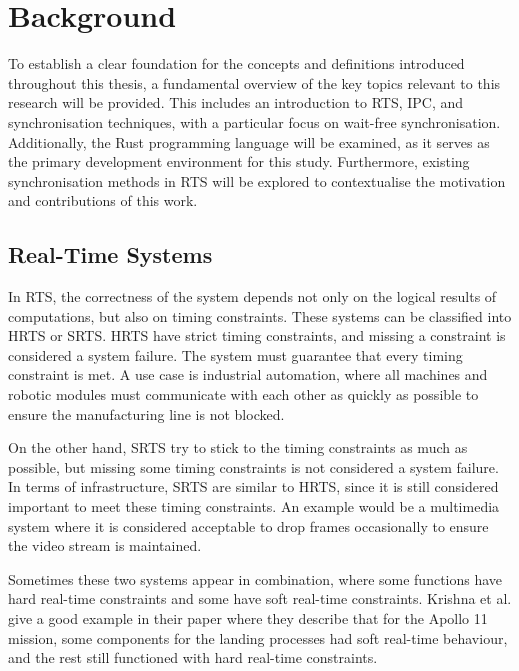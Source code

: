 \chapter{Background}\label{ch:background}

To establish a clear foundation for the concepts and definitions introduced throughout this thesis, a fundamental overview of the key topics relevant to this research will be provided. This includes an introduction to \ac{RTS}, \acf{IPC}, and synchronisation techniques, with a particular focus on wait-free synchronisation. Additionally, the Rust programming language will be examined, as it serves as the primary development environment for this study. Furthermore, existing synchronisation methods in \ac{RTS} will be explored to contextualise the motivation and contributions of this work.

\section{Real-Time Systems}\label{sec:real-time}

In \ac{RTS}, the correctness of the system depends not only on the logical results of computations, but also on timing constraints. These systems can be classified into \ac{HRTS} or \ac{SRTS}. \ac{HRTS} have strict timing constraints, and missing a constraint is considered a system failure. The system must guarantee that every timing constraint is met. A use case is industrial automation, where all machines and robotic modules must communicate with each other as quickly as possible to ensure the manufacturing line is not blocked. \cite{HardSoftRealTime}

On the other hand, \ac{SRTS} try to stick to the timing constraints as much as possible, but missing some timing constraints is not considered a system failure. In terms of infrastructure, \ac{SRTS} are similar to \ac{HRTS}, since it is still considered important to meet these timing constraints. An example would be a multimedia system where it is considered acceptable to drop frames occasionally to ensure the video stream is maintained. \cite{HardSoftRealTime}

Sometimes these two systems appear in combination, where some functions have hard real-time constraints and some have soft real-time constraints. Krishna et al. give a good example in their paper where they describe that for the Apollo 11 mission, some components for the landing processes had soft real-time behaviour, and the rest still functioned with hard real-time constraints. \cite{HardSoftRealTime}

